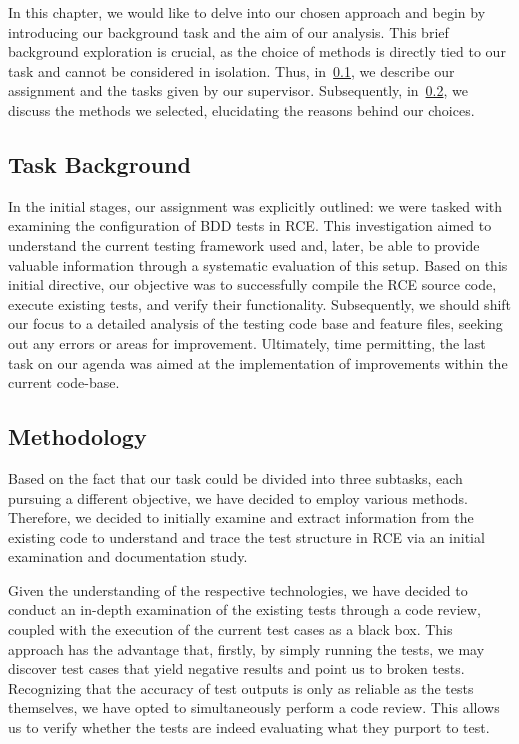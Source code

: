 In this chapter, we would like to delve into our chosen approach and begin by introducing our background task and the aim of our analysis. This brief background exploration is crucial, as the choice of methods is directly tied to our task and cannot be considered in isolation. Thus, in~\cref{subsec:Task}, we describe our assignment and the tasks given by our supervisor. Subsequently, in~\cref{subsec:Methodologies}, we discuss the methods we selected, elucidating the reasons behind our choices.

\subsection{Task Background}
\label{subsec:Task}
In the initial stages, our assignment was explicitly outlined: we were tasked with examining the configuration of \ac{BDD} tests in \ac{RCE}. This investigation aimed to understand the current testing framework used and, later, be able to provide valuable information through a systematic evaluation of this setup. Based on this initial directive, our objective was to successfully compile the \ac{RCE} source code, execute existing tests, and verify their functionality. Subsequently, we should shift our focus to a detailed analysis of the testing code base and feature files, seeking out any errors or areas for improvement. Ultimately, time permitting, the last task on our agenda was aimed at the implementation of improvements within the current code-base.

\subsection{Methodology}
\label{subsec:Methodologies}
Based on the fact that our task could be divided into three subtasks, each pursuing a different objective, we have decided to employ various methods. Therefore, we decided to initially examine and extract information from the existing code to understand and trace the test structure in \ac{RCE} via an initial examination and documentation study.

Given the understanding of the respective technologies, we have decided to conduct an in-depth examination of the existing tests through a code review, coupled with the execution of the current test cases as a black box. This approach has the advantage that, firstly, by simply running the tests, we may discover test cases that yield negative results and point us to broken tests. Recognizing that the accuracy of test outputs is only as reliable as the tests themselves, we have opted to simultaneously perform a code review. This allows us to verify whether the tests are indeed evaluating what they purport to test. 

